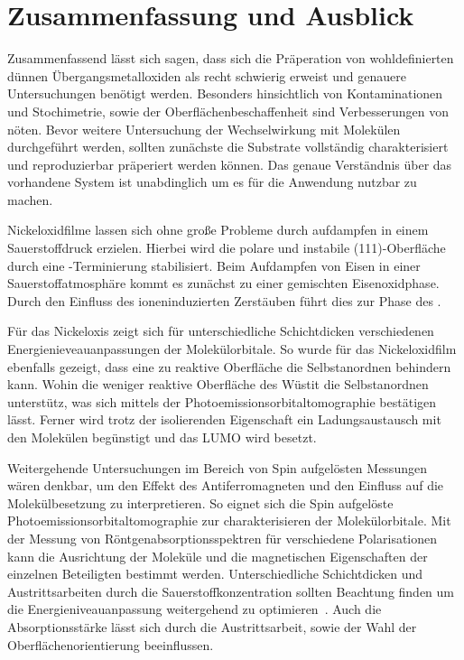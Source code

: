 \chapter{Zusammenfassung und Ausblick}
    Zusammenfassend lässt sich sagen, dass sich die Präperation von wohldefinierten dünnen Übergangsmetalloxiden als recht schwierig erweist und genauere Untersuchungen benötigt werden.
    Besonders hinsichtlich von Kontaminationen und Stochimetrie, sowie der Oberflächenbeschaffenheit sind Verbesserungen von nöten.
    Bevor weitere Untersuchung der Wechselwirkung mit Molekülen durchgeführt werden, sollten zunächste die Substrate vollständig charakterisiert und reproduzierbar präperiert werden können.
    Das genaue Verständnis über das vorhandene System ist unabdinglich um es für die Anwendung nutzbar zu machen.

    Nickeloxidfilme lassen sich ohne große Probleme durch aufdampfen in einem Sauerstoffdruck erzielen.
    Hierbei wird die polare und instabile (111)-Oberfläche durch eine -Terminierung stabilisiert.
    Beim Aufdampfen von Eisen in einer Sauerstoffatmosphäre kommt es zunächst zu einer gemischten Eisenoxidphase.
    Durch den Einfluss des ioneninduzierten Zerstäuben führt dies zur Phase des .
    
    Für das Nickeloxis zeigt sich für unterschiedliche Schichtdicken verschiedenen Energienieveauanpassungen der Molekülorbitale.
    So wurde für das Nickeloxidfilm ebenfalls gezeigt, dass eine zu reaktive Oberfläche die Selbstanordnen behindern kann.
    Wohin die weniger reaktive Oberfläche des Wüstit die Selbstanordnen unterstütz, was sich mittels der Photoemissionsorbitaltomographie bestätigen lässt.
    Ferner wird trotz der isolierenden Eigenschaft ein Ladungsaustausch mit den Molekülen begünstigt und das LUMO wird besetzt.

    Weitergehende Untersuchungen im Bereich von Spin aufgelösten Messungen wären denkbar, um den Effekt des Antiferromagneten und den Einfluss auf die Molekülbesetzung zu interpretieren.
    So eignet sich die Spin aufgelöste Photoemissionsorbitaltomographie zur charakterisieren der Molekülorbitale.
    Mit der Messung von Röntgenabsorptionsspektren für verschiedene Polarisationen kann die Ausrichtung der Moleküle und die magnetischen Eigenschaften der einzelnen Beteiligten bestimmt werden.
    Unterschiedliche Schichtdicken und Austrittsarbeiten durch die Sauerstoffkonzentration sollten Beachtung finden um die Energieniveauanpassung weitergehend zu optimieren~\cite{IF_8}.
    Auch die Absorptionsstärke lässt sich durch die Austrittsarbeit, sowie der Wahl der Oberflächenorientierung beeinflussen.
